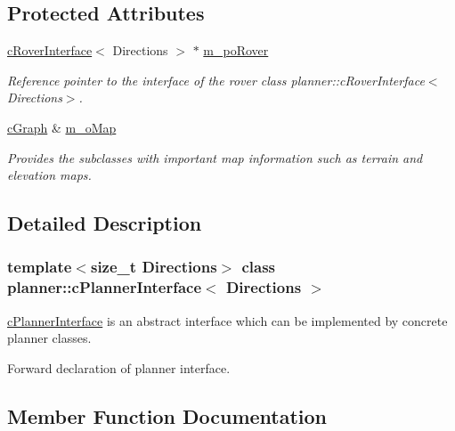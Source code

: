\subsection*{Protected Attributes}
\begin{DoxyCompactItemize}
\item 
\mbox{\label{classplanner_1_1c_planner_interface_a1852a0026adea5745fbb6a0d24fc1d89}} 
\mbox{\hyperlink{classplanner_1_1c_rover_interface}{c\+Rover\+Interface}}$<$ Directions $>$ $\ast$ \mbox{\hyperlink{classplanner_1_1c_planner_interface_a1852a0026adea5745fbb6a0d24fc1d89}{m\+\_\+po\+Rover}}
\begin{DoxyCompactList}\small\item\em Reference pointer to the interface of the rover class planner\+::c\+Rover\+Interface$<$\+Directions$>$. \end{DoxyCompactList}\item 
\mbox{\label{classplanner_1_1c_planner_interface_a5879156b36e10ec8941a6d29617ca7be}} 
\mbox{\hyperlink{classplanner_1_1c_graph}{c\+Graph}} \& \mbox{\hyperlink{classplanner_1_1c_planner_interface_a5879156b36e10ec8941a6d29617ca7be}{m\+\_\+o\+Map}}
\begin{DoxyCompactList}\small\item\em Provides the subclasses with important map information such as terrain and elevation maps. \end{DoxyCompactList}\end{DoxyCompactItemize}


\subsection{Detailed Description}
\subsubsection*{template$<$size\+\_\+t Directions$>$\newline
class planner\+::c\+Planner\+Interface$<$ Directions $>$}

\mbox{\hyperlink{classplanner_1_1c_planner_interface}{c\+Planner\+Interface}} is an abstract interface which can be implemented by concrete planner classes. 

Forward declaration of planner interface. 

\subsection{Member Function Documentation}
\mbox{\label{classplanner_1_1c_planner_interface_a499d8d3b81b0090318f4f2ea044c084c}} 
